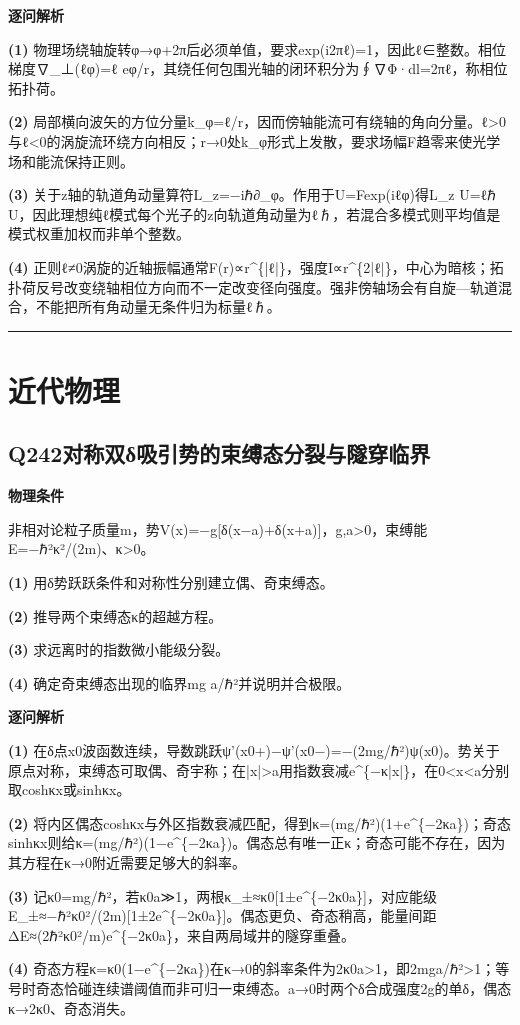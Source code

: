 \documentclass[UTF8,a4paper,11pt,oneside,openany]{ctexbook}
\begin{document}
\par\medskip\noindent\textbf{逐问解析}
\par\noindent\textbf{(1)} 物理场绕轴旋转φ→φ+2π后必须单值，要求exp(i2πℓ)=1，因此ℓ∈整数。相位梯度∇\_⊥(ℓφ)=ℓ eφ/r，其绕任何包围光轴的闭环积分为∮∇Φ·dl=2πℓ，称相位拓扑荷。
\par\noindent\textbf{(2)} 局部横向波矢的方位分量k\_φ=ℓ/r，因而傍轴能流可有绕轴的角向分量。ℓ>0与ℓ<0的涡旋流环绕方向相反；r→0处k\_φ形式上发散，要求场幅F趋零来使光学场和能流保持正则。
\par\noindent\textbf{(3)} 关于z轴的轨道角动量算符L\_z=−iℏ∂\_φ。作用于U=Fexp(iℓφ)得L\_z U=ℓℏ U，因此理想纯ℓ模式每个光子的z向轨道角动量为ℓℏ，若混合多模式则平均值是模式权重加权而非单个整数。
\par\noindent\textbf{(4)} 正则ℓ≠0涡旋的近轴振幅通常F(r)∝r\textasciicircum{}\{|ℓ|\}，强度I∝r\textasciicircum{}\{2|ℓ|\}，中心为暗核；拓扑荷反号改变绕轴相位方向而不一定改变径向强度。强非傍轴场会有自旋—轨道混合，不能把所有角动量无条件归为标量ℓℏ。

\par\bigskip\hrule\bigskip
\chapter{近代物理}
\section*{Q242\quad 对称双δ吸引势的束缚态分裂与隧穿临界}
\textbf{物理条件}\par 非相对论粒子质量m，势V(x)=−g[δ(x−a)+δ(x+a)]，g,a>0，束缚能E=−ℏ²κ²/(2m)、κ>0。
\par\noindent\textbf{(1)} 用δ势跃跃条件和对称性分别建立偶、奇束缚态。
\par\noindent\textbf{(2)} 推导两个束缚态κ的超越方程。
\par\noindent\textbf{(3)} 求远离时的指数微小能级分裂。
\par\noindent\textbf{(4)} 确定奇束缚态出现的临界mg a/ℏ²并说明并合极限。

\par\medskip\noindent\textbf{逐问解析}
\par\noindent\textbf{(1)} 在δ点x0波函数连续，导数跳跃ψ'(x0+)−ψ'(x0−)=−(2mg/ℏ²)ψ(x0)。势关于原点对称，束缚态可取偶、奇宇称；在|x|>a用指数衰减e\textasciicircum{}\{−κ|x|\}，在0<x<a分别取coshκx或sinhκx。
\par\noindent\textbf{(2)} 将内区偶态coshκx与外区指数衰减匹配，得到κ=(mg/ℏ²)(1+e\textasciicircum{}\{−2κa\})；奇态sinhκx则给κ=(mg/ℏ²)(1−e\textasciicircum{}\{−2κa\})。偶态总有唯一正κ；奇态可能不存在，因为其方程在κ→0附近需要足够大的斜率。
\par\noindent\textbf{(3)} 记κ0=mg/ℏ²，若κ0a≫1，两根κ\_±≈κ0[1±e\textasciicircum{}\{−2κ0a\}]，对应能级E\_±≈−ℏ²κ0²/(2m)[1±2e\textasciicircum{}\{−2κ0a\}]。偶态更负、奇态稍高，能量间距ΔE≈(2ℏ²κ0²/m)e\textasciicircum{}\{−2κ0a\}，来自两局域井的隧穿重叠。
\par\noindent\textbf{(4)} 奇态方程κ=κ0(1−e\textasciicircum{}\{−2κa\})在κ→0的斜率条件为2κ0a>1，即2mga/ℏ²>1；等号时奇态恰碰连续谱阈值而非可归一束缚态。a→0时两个δ合成强度2g的单δ，偶态κ→2κ0、奇态消失。
\end{document}
